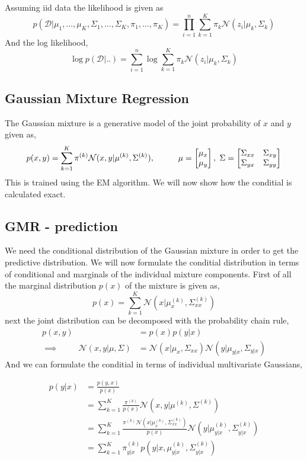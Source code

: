 Assuming iid data the likelihood is given as 
$$p(\mathcal{D}|\mu_1, \dots, \mu_K, \Sigma_1, \dots, \Sigma_K, \pi_1, \dots, \pi_K) = \prod_{i=1}^n \sum_{k=1}^K \pi_k \mathcal{N}(z_i|\mu_k, \Sigma_k)$$
And the log likelihood, 
$$\log p(\mathcal{D}| ..) = \sum_{i=1}^n \log \sum_{k=1}^K \pi_k \mathcal{N}(z_i|\mu_k, \Sigma_k)$$


\subsection{Gaussian Mixture Regression}
The Gaussian mixture is a generative model of the joint probability of $x$ and $y$ given as, 
$$p(x,y)= \sum_{k=1}^K \pi^{(k)} \mathcal{N}(x,y|\mu^{(k)},\Sigma^{(k)}), 
\hspace{1cm} \mu=\begin{bmatrix}
    \mu_x \\ \mu_y
\end{bmatrix},\hspace{0.1cm} \Sigma = \begin{bmatrix}
    \Sigma_{xx} & \Sigma_{xy}\\ \Sigma_{yx}& \Sigma_{yy}
\end{bmatrix}$$
This is trained using the EM algorithm. We will now show how the conditial is
calculated exact. 
\subsection{GMR - prediction}
We need the conditional distribution of the Gaussian mixture
in order to get the predictive distribution. We will now formulate
the conditial distribution in terms of conditional and marginals of
the individual mixture components. First of all the marginal distribution $p(x)$ 
of the mixture is given as, 
$$p(x) = \sum_{k=1}^K \mathcal{N}(x|\mu_{x}^{(k)},\Sigma_{xx}^{(k)})$$ 
next the joint distribution can be decomposed with the probability chain rule,
\begin{align*}
    p(x,y) &= p(x)p(y|x)\\
    \implies \hspace{1cm} \mathcal{N}(x,y|\mu,\Sigma) &= 
    \mathcal{N}(x|\mu_{x},\Sigma_{xx}) \mathcal{N}(y|\mu_{y|x},\Sigma_{y|x})
\end{align*} 
And we can formulate the conditial in terms of individual multivariate Gaussians, 

\begin{align}
    p(y|x) &= \frac{p(y,x)}{p(x)}\\
    &= \sum_{k=1}^K \frac{\pi^{(k)}}{p(x)} \mathcal{N}(x,y|\mu^{(k)},\Sigma^{(k)})\\
    &=  \sum_{k=1}^K \frac{\pi^{(k)} \mathcal{N}(x|\mu_{x}^{(k)},\Sigma_{xx}^{(k)})}{p(x)}\mathcal{N}(y|\mu_{y|x}^{(k)},\Sigma_{y|x}^{(k)})\\
    &=  \sum_{k=1}^K \pi_{y|x}^{(k)} p(y|x,\mu_{y|x}^{(k)},\Sigma_{y|x}^{(k)})
\end{align}

